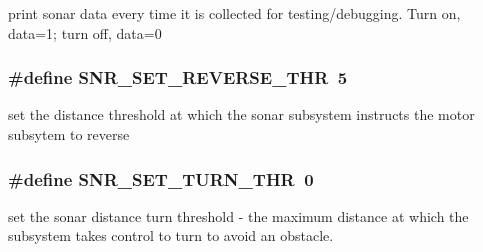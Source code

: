 print sonar data every time it is collected for testing/debugging. Turn on, data=1; turn off, data=0 \hypertarget{group__sonar__commands_gae78508a8d683aeda132c9b17ee4f384e}{
\subsubsection[{S\-N\-R\-\_\-\-S\-E\-T\-\_\-\-R\-E\-V\-E\-R\-S\-E\-\_\-\-T\-H\-R}]{\setlength{\rightskip}{0pt plus 5cm}\#define S\-N\-R\-\_\-\-S\-E\-T\-\_\-\-R\-E\-V\-E\-R\-S\-E\-\_\-\-T\-H\-R~5}}\label{group__sonar__commands_gae78508a8d683aeda132c9b17ee4f384e}
set the distance threshold at which the sonar subsystem instructs the motor subsytem to reverse \hypertarget{group__sonar__commands_ga514ade1790404e84c0f46b19ed69b696}{
\subsubsection[{S\-N\-R\-\_\-\-S\-E\-T\-\_\-\-T\-U\-R\-N\-\_\-\-T\-H\-R}]{\setlength{\rightskip}{0pt plus 5cm}\#define S\-N\-R\-\_\-\-S\-E\-T\-\_\-\-T\-U\-R\-N\-\_\-\-T\-H\-R~0}}\label{group__sonar__commands_ga514ade1790404e84c0f46b19ed69b696}
set the sonar distance turn threshold -\/ the maximum distance at which the subsystem takes control to turn to avoid an obstacle. 